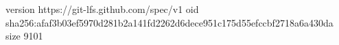 version https://git-lfs.github.com/spec/v1
oid sha256:afaf3b03ef5970d281b2a141fd2262d6dece951c175d55efccbf2718a6a430da
size 9101

